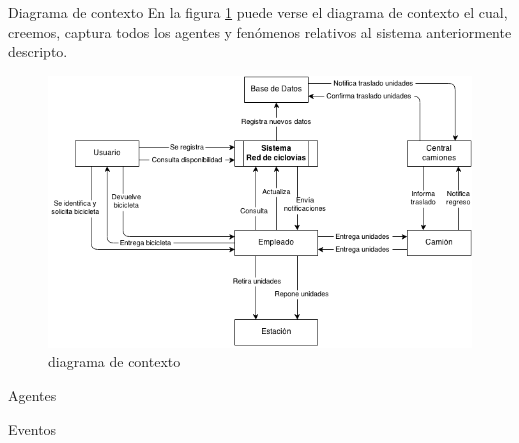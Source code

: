 
\begin{subsection}{Diagrama de contexto}
En la figura \ref{fig:diagrama_contexto} puede verse el diagrama de contexto el cual, creemos, captura todos los agentes y fenómenos relativos al sistema anteriormente descripto.

\begin{figure}[!ht]
\begin{center}
\includegraphics[scale=0.60]{imagenes/diagrama_contexto.png}
\caption{diagrama de contexto}
\label{fig:diagrama_contexto}
\end{center}
\end{figure}
\end{subsection}

\begin{subsection}{Agentes}

\end{subsection}

\begin{subsection}{Eventos}

\end{subsection} 
